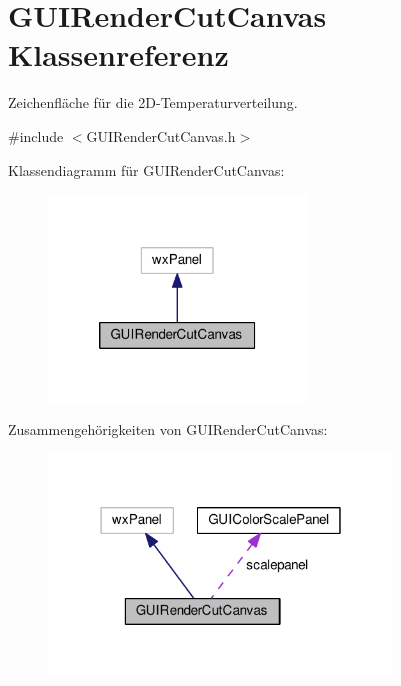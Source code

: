 \hypertarget{classGUIRenderCutCanvas}{\section{G\-U\-I\-Render\-Cut\-Canvas Klassenreferenz}
\label{classGUIRenderCutCanvas}
}


Zeichenfläche für die 2\-D-\/\-Temperaturverteilung.  




{\ttfamily \#include $<$G\-U\-I\-Render\-Cut\-Canvas.\-h$>$}



Klassendiagramm für G\-U\-I\-Render\-Cut\-Canvas\-:\nopagebreak
\begin{figure}[H]
\begin{center}
\leavevmode
\includegraphics[width=194pt]{classGUIRenderCutCanvas__inherit__graph}
\end{center}
\end{figure}


Zusammengehörigkeiten von G\-U\-I\-Render\-Cut\-Canvas\-:\nopagebreak
\begin{figure}[H]
\begin{center}
\leavevmode
\includegraphics[width=259pt]{classGUIRenderCutCanvas__coll__graph}
\end{center}
\end{figure}
